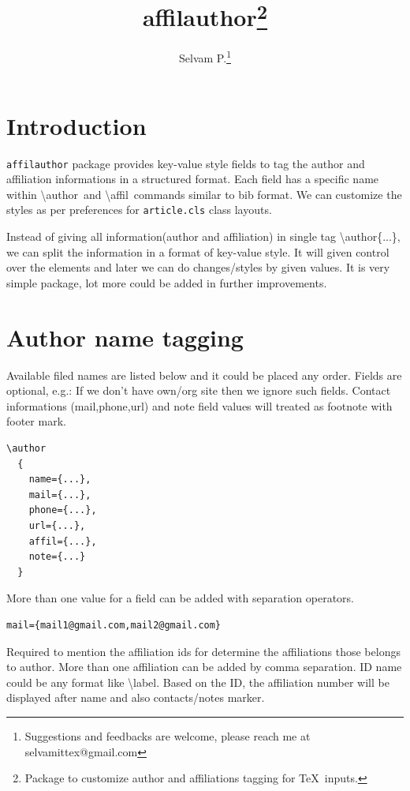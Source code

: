 \documentclass{article}
\title{affilauthor\thanks{Package to customize author and affiliations tagging for \TeX\ inputs.}}
\author{Selvam P.\thanks{Suggestions and feedbacks are welcome, please reach me at selvamittex@gmail.com}}
\date{}                     %
\begin{document}
  \maketitle

\section*{Introduction}

{\tt affilauthor} package provides key-value style fields to tag the author and affiliation informations in a structured format. Each field has a specific name within \textbackslash author\ and \textbackslash affil\ commands similar to bib format. We can customize the styles as per preferences for {\tt article.cls} class layouts.

Instead of giving all information(author and affiliation) in single tag {\textbackslash author\{...\}}, we can split the information in a format of key-value style. It will given control over the elements and later we can do changes/styles by given values. It is very simple package, lot more could be added in further improvements.

\section*{Author name tagging}

Available filed names are listed below and it could be placed any order. Fields are optional, e.g.: If we don't have own/org site then we ignore such fields. Contact informations (mail,phone,url) and note field values will treated as footnote with footer mark.

\begin{lstlisting}[style=mystyle]
\author
  {
    name={...},
    mail={...},
    phone={...},
    url={...},    
    affil={...},
    note={...}    
  }
\end{lstlisting}

More than one value for a field can be added with separation operators. 
\begin{lstlisting}[style=mystyle]
  mail={mail1@gmail.com,mail2@gmail.com}
\end{lstlisting}

Required to mention the affiliation ids for determine the affiliations those belongs to author. More than one affiliation can be added by comma separation. ID name could be any format like \textbackslash label. Based on the ID, the affiliation number will be displayed after name and also contacts/notes marker.
\end{document}
